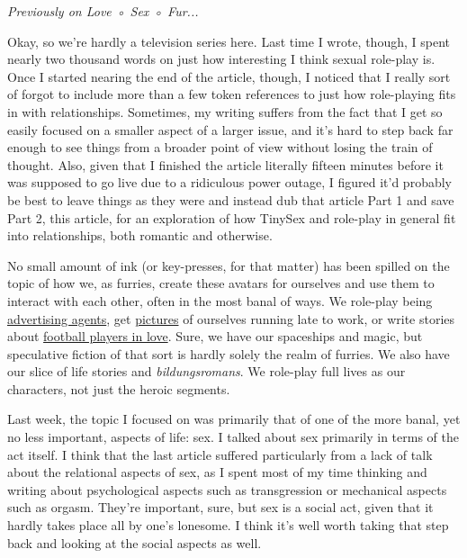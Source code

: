 
\emph{Previously on Love ◦ Sex ◦ Fur...}

Okay, so we're hardly a television series here. Last time I wrote, though, I spent nearly two thousand words on just how interesting I think sexual role-play is. Once I started nearing the end of the article, though, I noticed that I really sort of forgot to include more than a few token references to just how role-playing fits in with relationships. Sometimes, my writing suffers from the fact that I get so easily focused on a smaller aspect of a larger issue, and it's hard to step back far enough to see things from a broader point of view without losing the train of thought. Also, given that I finished the article literally fifteen minutes before it was supposed to go live due to a ridiculous power outage, I figured it'd probably be best to leave things as they were and instead dub that article Part 1 and save Part 2, this article, for an exploration of how TinySex and role-play in general fit into relationships, both romantic and otherwise.

No small amount of ink (or key-presses, for that matter) has been spilled on the topic of how we, as furries, create these avatars for ourselves and use them to interact with each other, often in the most banal of ways. We role-play being \href{http://characters.openfurry.org/description/19}{advertising agents}, get \href{http://www.furaffinity.net/view/9927219}{pictures} of ourselves running late to work, or write stories about \href{http://www.kyellgold.com/books/oop.html}{football players in love}. Sure, we have our spaceships and magic, but speculative fiction of that sort is hardly solely the realm of furries. We also have our slice of life stories and \emph{bildungsromans}. We role-play full lives as our characters, not just the heroic segments.

Last week, the topic I focused on was primarily that of one of the more banal, yet no less important, aspects of life: sex. I talked about sex primarily in terms of the act itself. I think that the last article suffered particularly from a lack of talk about the relational aspects of sex, as I spent most of my time thinking and writing about psychological aspects such as transgression or mechanical aspects such as orgasm. They're important, sure, but sex is a social act, given that it hardly takes place all by one's lonesome. I think it's well worth taking that step back and looking at the social aspects as well.

